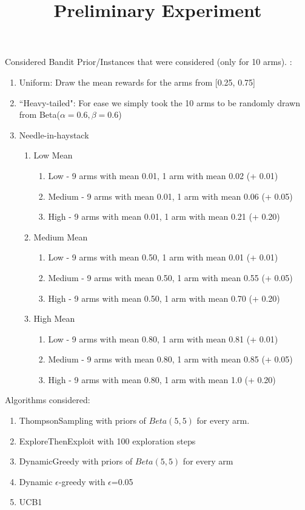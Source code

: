 \documentclass[11pt,letterpaper]{article}
\begin{document}
 

\title{Preliminary Experiment}
\maketitle

Considered Bandit Prior/Instances that were considered (only for 10 arms). :
\begin{enumerate}
\item Uniform: Draw the mean rewards for the arms from [0.25, 0.75]
\item ``Heavy-tailed": For ease we simply took the 10 arms to be randomly drawn from Beta($\alpha=0.6,\beta=0.6$)
\item Needle-in-haystack
\begin{enumerate}
\item Low Mean
\begin{enumerate}
\item Low - 9 arms with mean 0.01, 1 arm with mean 0.02 (+ 0.01)
\item Medium - 9 arms with mean 0.01, 1 arm with mean 0.06 (+ 0.05)
\item High - 9 arms with mean 0.01, 1 arm with mean 0.21 (+ 0.20)
\end{enumerate}
\item Medium Mean
\begin{enumerate}
\item Low - 9 arms with mean 0.50, 1 arm with mean 0.01 (+ 0.01)
\item Medium - 9 arms with mean 0.50, 1 arm with mean 0.55 (+ 0.05)
\item High - 9 arms with mean 0.50, 1 arm with mean 0.70 (+ 0.20)
\end{enumerate}
\item High Mean
\begin{enumerate}
\item Low - 9 arms with mean 0.80, 1 arm with mean 0.81 (+ 0.01)
\item Medium - 9 arms with mean 0.80, 1 arm with mean 0.85 (+ 0.05)
\item High - 9 arms with mean 0.80, 1 arm with mean 1.0 (+ 0.20)
\end{enumerate}
\end{enumerate}
\end{enumerate}

Algorithms considered:
\begin{enumerate}
\item ThompsonSampling with priors of $Beta(5, 5)$ for every arm.
\item ExploreThenExploit with 100 exploration steps
\item DynamicGreedy with priors of $Beta(5, 5)$ for every arm
\item Dynamic $\epsilon$-greedy with $\epsilon$=0.05
\item UCB1
\end{enumerate}
\end{document}
